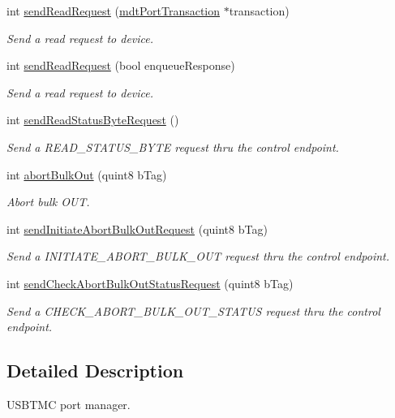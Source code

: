 \begin{DoxyCompactItemize}
int \hyperlink{classmdt_usbtmc_port_manager_a2920bdd6b189f198f132de9e5555a78b}{sendReadRequest} (\hyperlink{classmdt_port_transaction}{mdtPortTransaction} $\ast$transaction)
\begin{DoxyCompactList}\small\item\em Send a read request to device. \end{DoxyCompactList}\item 
int \hyperlink{classmdt_usbtmc_port_manager_ab1604a1c8f2e9192714d039dbf9a5158}{sendReadRequest} (bool enqueueResponse)
\begin{DoxyCompactList}\small\item\em Send a read request to device. \end{DoxyCompactList}\item 
int \hyperlink{classmdt_usbtmc_port_manager_a7bcc280bd4a26ed523832550b1e61553}{sendReadStatusByteRequest} ()
\begin{DoxyCompactList}\small\item\em Send a READ\_\-STATUS\_\-BYTE request thru the control endpoint. \end{DoxyCompactList}\item 
int \hyperlink{classmdt_usbtmc_port_manager_af412ba1b1e7e56ebecd2e59cb6bf607a}{abortBulkOut} (quint8 bTag)
\begin{DoxyCompactList}\small\item\em Abort bulk OUT. \end{DoxyCompactList}\item 
int \hyperlink{classmdt_usbtmc_port_manager_a987b71d620dac06be85567a92f272f6b}{sendInitiateAbortBulkOutRequest} (quint8 bTag)
\begin{DoxyCompactList}\small\item\em Send a INITIATE\_\-ABORT\_\-BULK\_\-OUT request thru the control endpoint. \end{DoxyCompactList}\item 
int \hyperlink{classmdt_usbtmc_port_manager_a724a999c11ab0458f53427fbb6862d62}{sendCheckAbortBulkOutStatusRequest} (quint8 bTag)
\begin{DoxyCompactList}\small\item\em Send a CHECK\_\-ABORT\_\-BULK\_\-OUT\_\-STATUS request thru the control endpoint. \end{DoxyCompactList}\end{DoxyCompactItemize}


\subsection{Detailed Description}
USBTMC port manager. 

